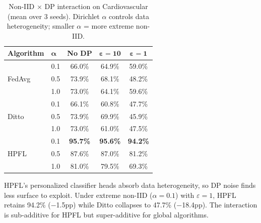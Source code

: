 \documentclass[conference]{IEEEtran}
\begin{document}
\begin{table}[htbp]
\centering
\caption{Non-IID $\times$ DP interaction on Cardiovascular (mean over 3 seeds). Dirichlet $\alpha$ controls data heterogeneity; smaller $\alpha$ = more extreme non-IID.}
\label{tab:noniid_dp}
\small
\begin{tabular}{llccc}
\toprule
\textbf{Algorithm} & $\boldsymbol{\alpha}$ & \textbf{No DP} & $\boldsymbol{\varepsilon{=}10}$ & $\boldsymbol{\varepsilon{=}1}$ \\
\midrule
\multirow{3}{*}{FedAvg} & 0.1 & 66.0\% & 64.9\% & 59.0\% \\
 & 0.5 & 73.9\% & 68.1\% & 48.2\% \\
 & 1.0 & 73.0\% & 64.1\% & 59.6\% \\
\midrule
\multirow{3}{*}{Ditto} & 0.1 & 66.1\% & 60.8\% & 47.7\% \\
 & 0.5 & 73.9\% & 69.9\% & 45.9\% \\
 & 1.0 & 73.0\% & 61.0\% & 47.5\% \\
\midrule
\multirow{3}{*}{HPFL} & 0.1 & \textbf{95.7\%} & \textbf{95.6\%} & \textbf{94.2\%} \\
 & 0.5 & 87.6\% & 87.0\% & 81.2\% \\
 & 1.0 & 81.0\% & 79.5\% & 69.3\% \\
\bottomrule
\end{tabular}

\vspace{1mm}
\footnotesize{HPFL's personalized classifier heads absorb data heterogeneity, so DP noise finds less surface to exploit. Under extreme non-IID ($\alpha{=}0.1$) with $\varepsilon{=}1$, HPFL retains 94.2\% ($-$1.5pp) while Ditto collapses to 47.7\% ($-$18.4pp). The interaction is sub-additive for HPFL but super-additive for global algorithms.}
\end{table}

\end{document}
